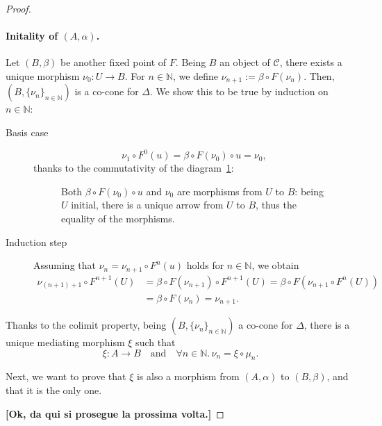 \begin{proof}
  \paragraph{Initality of \((A,\alpha)\).} Let \((B,\beta)\) be another fixed point of \(F\).
  Being \(B\) an object of \(\mathcal{C}\), there exists a unique morphism \(\nu_0 \colon U \to B\).
  For \(n \in \mathbb{N}\), we define \(\nu_{n+1} := \beta \circ F(\nu_n)\).
  Then, \((B,\lbrace \nu_n \rbrace_{n \in \mathbb{N}})\) is a co-cone for \(\Delta\). We show this to be true by induction on \(n \in \mathbb{N}\):
  \begin{description}
    \item[Basis case]
    \begin{equation}
      \nu_1 \circ F^0(u) = \beta \circ F(\nu_0) \circ u = \nu_0,
    \end{equation}
    thanks to the commutativity of the diagram~\ref{02:diagram-2}:
    \begin{figure}[!ht]
      \begin{center}
      \end{center}
      \caption{Both \(\beta \circ F(\nu_0) \circ u\) and \(\nu_0\) are morphisms from \(U\) to \(B\): being \(U\) initial, there is a unique arrow from \(U\) to \(B\), thus the equality of the morphisms.}
      \label{02:diagram-2}
    \end{figure}
    \item[Induction step] Assuming that \(\nu_n = \nu_{n+1} \circ F^n(u)\) holds for \(n \in \mathbb{N}\), we obtain
    \begin{equation*}
      \begin{split}
        \nu_{(n+1)+1} \circ F^{n+1}(U) &=
        \beta \circ F(\nu_{n+1}) \circ F^{n+1}(U)
        = \beta \circ F(\nu_{n+1} \circ F^n(U)) \\
        &= \beta \circ F(\nu_n) = \nu_{n+1}.
      \end{split}
    \end{equation*}
  \end{description}
  Thanks to the colimit property, being \((B,\lbrace \nu_n \rbrace_{n \in \mathbb{N}})\) a co-cone for \(\Delta\), there is a unique mediating morphism \(\xi\) such that
  \begin{equation*}
    \xi \colon A \to B \quad\text{and}\quad \forall n \in \mathbb{N}.\, \nu_n = \xi \circ \mu_n.
  \end{equation*}
  
  Next, we want to prove that \(\xi\) is also a morphism from \((A,\alpha)\) to \((B,\beta)\), and that it is the only one.
  
  \textbf{[Ok, da qui si prosegue la prossima volta.]}
\end{proof}